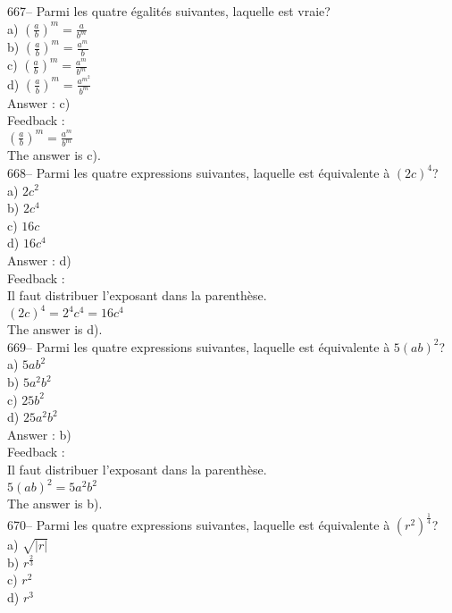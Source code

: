 \documentclass[letterpaper, 12pt]{article}
\begin{document}
667-- Parmi les quatre \'egalit\'es suivantes, laquelle est vraie?\\
a) $\left( \frac{a}{b}\right)^{m} =\frac{a}{b^{m}}$\\[2mm]
b) $\left( \frac{a}{b}\right)^{m} =\frac{a^{m}}{b}$\\[2mm]
c) $\left( \frac{a}{b}\right)^{m} =\frac{a^{m}}{b^{m}}$\\[2mm]
d) $\left( \frac{a}{b}\right)^{m} =\frac{a^{m^{2}}}{b^{m}}$\\

Answer : c)\\

Feedback : \\[2mm]
$\left( \frac{a}{b}\right)^{m} =\frac{a^{m}}{b^{m}}$\\[2mm]
The answer is c).\\

668-- Parmi les quatre expressions suivantes, laquelle est \'equivalente \`a
$\left( 2c\right) ^{4}$?\\
a) $2c^{2}$\\
b) $2c^{4}$\\
c) $16c$\\
d) $16c^{4}$\\

Answer : d)\\

Feedback : \\
Il faut distribuer l'exposant dans la parenth\`ese.\\
$\left( 2c\right) ^{4}=2^{4}c^{4}=16c^{4}$\\
The answer is d).\\

669-- Parmi les quatre expressions suivantes, laquelle est \'equivalente \`a
$5\left( ab\right) ^{2}$?\\
a) $5ab^{2}$\\
b) $5a^{2}b^{2}$\\
c) $25b^{2}$\\
d) $25a^{2}b^{2}$\\

Answer : b)\\

Feedback : \\
Il faut distribuer l'exposant dans la parenth\`ese.\\
$5\left( ab\right) ^{2}=5a^{2}b^{2}$\\
The answer is b).\\

670-- Parmi les quatre expressions suivantes, laquelle est \'equivalente \`a
$\left( r^{2}\right)^\frac{1}{4}$?\\
a) $\sqrt{|r|}$\\
b) $r^{\frac{2}{3}}$\\
c) $r^{2}$\\
d) $r^{3}$\\
\end{document}

